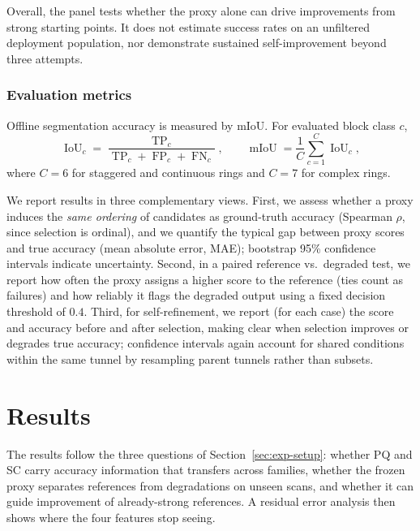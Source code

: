 \documentclass[a4paper,fleqn]{cas-dc}
\begin{document}
{Overall, the panel tests whether the proxy alone can drive improvements from strong starting points. It does not estimate success rates on an unfiltered deployment population, nor demonstrate sustained self-improvement beyond three attempts.


\subsubsection{Evaluation metrics}
\label{sec:metrics}

Offline segmentation accuracy is measured by mIoU. For evaluated block class $c$,
\begin{equation}
\operatorname{IoU}_c
=
\frac{\operatorname{TP}_c}
{\operatorname{TP}_c+\operatorname{FP}_c+\operatorname{FN}_c},
\qquad
\operatorname{mIoU}
=
\frac{1}{C}\sum_{c=1}^{C}\operatorname{IoU}_c,
\end{equation}
where $C=6$ for staggered and continuous rings and $C=7$ for complex rings.

We report results in three complementary views. First, we assess whether a proxy induces the \emph{same ordering} of candidates as ground-truth accuracy (Spearman $\rho$, since selection is ordinal), and we quantify the typical gap between proxy scores and true accuracy (mean absolute error, MAE); bootstrap 95\% confidence intervals indicate uncertainty. Second, in a paired reference vs.~degraded test, we report how often the proxy assigns a higher score to the reference (ties count as failures) and how reliably it flags the degraded output using a fixed decision threshold of $0.4$. Third, for self-refinement, we report (for each case) the score and accuracy before and after selection, making clear when selection improves or degrades true accuracy; confidence intervals again account for shared conditions within the same tunnel by resampling parent tunnels rather than subsets.

\section{Results}\label{sec:results}

The results follow the three questions of Section~\ref{sec:exp-setup}: whether PQ and SC carry accuracy information that transfers across families, whether the frozen proxy separates references from degradations on unseen scans, and whether it can guide improvement of already-strong references. A residual error analysis then shows where the four features stop seeing.

}
\end{document}
